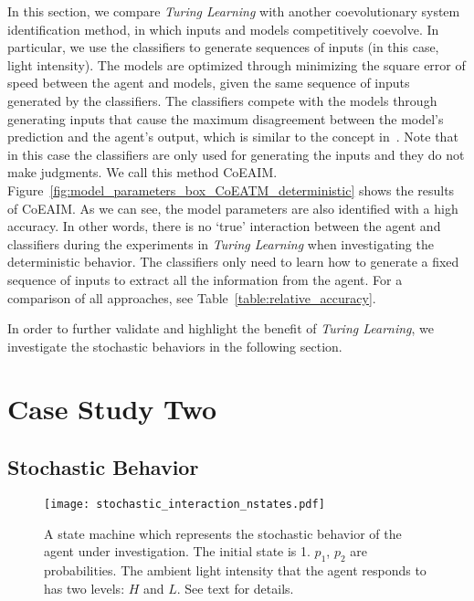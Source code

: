 In this section, we compare \textit{Turing Learning} with another coevolutionary system identification method, in which inputs and models competitively coevolve. In particular, we use the classifiers to generate sequences of inputs (in this case, light intensity). The models are optimized through minimizing the square error of speed between the agent and models, given the same sequence of inputs generated by the classifiers. The classifiers compete with the models through generating inputs that cause the maximum disagreement between the model's prediction and the agent's output, which is similar to the concept in~\cite{Bongard2005_tevc}. Note that in this case the classifiers are only used for generating the inputs and they do not make judgments. We call this method CoEAIM. Figure~\ref{fig:model_parameters_box_CoEATM_deterministic} shows the results of CoEAIM. As we can see, the model parameters are also identified with a high accuracy. In other words, there is no `true' interaction between the agent and classifiers during the experiments in \textit{Turing Learning} when investigating the deterministic behavior. The classifiers only need to learn how to generate a fixed sequence of inputs to extract all the information from the agent. For a comparison of all approaches, see Table~\ref{table:relative_accuracy}. 

In order to further validate and highlight the benefit of \textit{Turing Learning}, we investigate the stochastic behaviors in the following section. 

\section{Case Study Two}\label{sec:case_study_two_stochastic_interaction}

\subsection{Stochastic Behavior}\label{sec:stochastic_behavior_interaction}

\begin{figure}[!t]
\centering
\texttt{[image: stochastic\_interaction\_nstates.pdf]}
\caption{A state machine which represents the stochastic behavior of the agent under investigation. The initial state is 1. $p_1$, $p_2$ are probabilities. The ambient light intensity that the agent responds to has two levels: $H$ and $L$. See text for details.}
\label{fig:stochastic_behavior_n_states} 
\end{figure}

